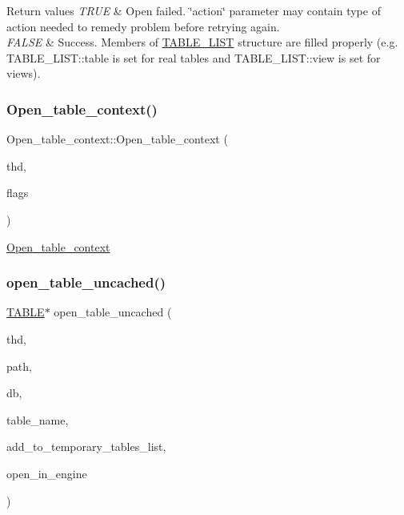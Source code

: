 \begin{DoxyRetVals}{Return values}
{\em T\+R\+UE} & Open failed. \char`\"{}action\char`\"{} parameter may contain type of action needed to remedy problem before retrying again. \\
\hline
{\em F\+A\+L\+SE} & Success. Members of \mbox{\hyperlink{structTABLE__LIST}{T\+A\+B\+L\+E\+\_\+\+L\+I\+ST}} structure are filled properly (e.\+g. T\+A\+B\+L\+E\+\_\+\+L\+I\+S\+T\+::table is set for real tables and T\+A\+B\+L\+E\+\_\+\+L\+I\+S\+T\+::view is set for views). \\
\hline
\end{DoxyRetVals}
\mbox{\label{group__Data__Dictionary_ga8eaa3b1fdce29eac72028f96c55607d3}} 
\subsubsection{\texorpdfstring{Open\+\_\+table\+\_\+context()}{Open\_table\_context()}}
{\footnotesize\ttfamily Open\+\_\+table\+\_\+context\+::\+Open\+\_\+table\+\_\+context (\begin{DoxyParamCaption}\item[{T\+HD $\ast$}]{thd,  }\item[{uint}]{flags }\end{DoxyParamCaption})}

\mbox{\hyperlink{classOpen__table__context}{Open\+\_\+table\+\_\+context}} \mbox{\label{group__Data__Dictionary_ga35659d6f0f8a6d39ee3f3db7c233df52}} 
\subsubsection{\texorpdfstring{open\+\_\+table\+\_\+uncached()}{open\_table\_uncached()}}
{\footnotesize\ttfamily \mbox{\hyperlink{structTABLE}{T\+A\+B\+LE}}$\ast$ open\+\_\+table\+\_\+uncached (\begin{DoxyParamCaption}\item[{T\+HD $\ast$}]{thd,  }\item[{const char $\ast$}]{path,  }\item[{const char $\ast$}]{db,  }\item[{const char $\ast$}]{table\+\_\+name,  }\item[{bool}]{add\+\_\+to\+\_\+temporary\+\_\+tables\+\_\+list,  }\item[{bool}]{open\+\_\+in\+\_\+engine }\end{DoxyParamCaption})}

